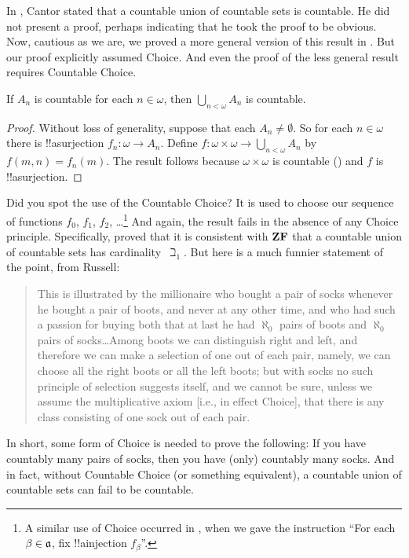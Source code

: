 \documentclass[../../../include/open-logic-section]{subfiles}
\begin{document}
\begin{ex} 
In \citeyear{Cantor1878}, Cantor stated that a countable union of
countable sets is countable. He did not present a proof, perhaps
indicating that he took the proof to be obvious. Now, cautious as we
are, we proved a more general version of this result in
.  But our proof
explicitly assumed Choice. And even the proof of the less general
result requires Countable Choice.

\begin{thm}
If $A_n$ is countable for each $n \in \omega$, then $\bigcup_{n <
\omega} A_n$ is countable.
\end{thm}

\begin{proof}
Without loss of generality, suppose that each $A_n \neq \emptyset$. So
for each $n \in \omega$ there is !!a{surjection} $f_n \colon \omega
\to A_n$. Define $f \colon \omega \times \omega \to \bigcup_{n <
\omega} A_n$ by $f(m, n) = f_n(m)$. The result follows because $\omega
\times \omega$ is countable
() and $f$ is
!!a{surjection}.
\end{proof}
\noindent 
Did you spot the use of the Countable Choice? It is used to choose our
sequence of functions $f_0$, $f_1$, $f_2$, \dots\footnote{A similar
use of Choice occurred in
, when we gave the
instruction ``For each $\beta \in \mathfrak{a}$, fix !!a{injection}
$f_\beta$''.} And again, the result fails in the absence of any Choice
principle. Specifically, \citet{FefermanLevy1963} proved that it is
consistent with $\mathbf{ZF}$ that a countable union of countable sets has
cardinality~$\beth_1$. But here is a much funnier statement of the
point, from Russell:
\begin{quote}
  This is illustrated by the millionaire who bought a pair of socks
  whenever he bought a pair of boots, and never at any other time, and
  who had such a passion for buying both that at last he had
  $\aleph_0$ pairs of boots and $\aleph_0$ pairs of socks\dots\@ Among
  boots we can distinguish right and left, and therefore we can make a
  selection of one out of each pair, namely, we can choose all the
  right boots or all the left boots; but with socks no such principle
  of selection suggests itself, and we cannot be sure, unless we
  assume the multiplicative axiom [i.e., in effect Choice], that there
  is any class consisting of one sock out of each pair.
  \citep[p.~126]{Russell1919}
\end{quote}
In short, some form of Choice is needed to prove the following: If you
have countably many pairs of socks, then you have (only) countably
many socks. And in fact, without Countable Choice (or something
equivalent), a countable union of countable sets can fail to be
countable. 
\end{ex}
\end{document}
